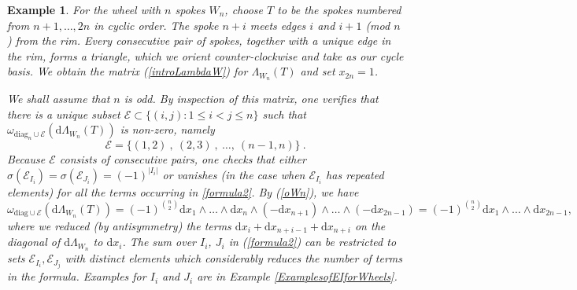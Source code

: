 \documentclass[10pt]{amsart}
\newcommand{\dd}{\mathrm{d}}
\newcommand{\sE}{\mathcal{E}}
\newcommand{\diag}{\mathrm{diag}}
\theoremstyle{plain}
\newtheorem{ex}[thm]{Example}
\newcommand{\0}{\color{blue}{\mathsf{0}}}
\begin{document}
\begin{ex}\label{wheelex5}
For the wheel with $n$ spokes $W_n$,  choose $T$ to be the spokes
 numbered from $n+1, \ldots, 2n$ in cyclic order. The spoke $n+i$ meets edges $i$ and $i+1$
(mod $n$) from the rim.
Every consecutive pair of spokes, together with a unique edge in the rim, forms a triangle, which we orient counter-clockwise and take as our  cycle basis. We obtain the matrix (\ref{introLambdaW}) for $\Lambda_{W_n}(T)$ and set $x_{2n}=1$.

We shall assume that $n$ is odd.  By inspection of this matrix,  one  verifies that there is a unique subset  $\sE \subset \{(i,j): 1\leq i<j\leq n\}$ such  that $\omega_{\diag_n\cup\sE}(\dd\Lambda_{W_n}(T))$ is non-zero, namely  
\[  \sE=\{(1,2) \ , \ (2,3) \ , \ \ldots, \ (n-1,n)\} \ . \]
Because $\sE$ consists of consecutive pairs, one checks that either  $\sigma(\sE_{I_i})=\sigma(\sE_{J_i})=(-1)^{|I_i|}$  or vanishes (in the case when $\sE_{I_i}$ has repeated elements) for all the terms occurring in \eqref{formula2}. 
By (\ref{oWn}), we have 
$$
\omega_{\diag\cup\sE}  (\dd\Lambda_{W_n}(T))=(-1)^{\binom{n}2}\dd x_1\wedge\ldots\wedge\dd x_n\wedge(-\dd x_{n+1})\wedge\ldots\wedge(-\dd x_{2n-1})=(-1)^{\binom{n}2}\dd x_1\wedge\ldots\wedge\dd x_{2n-1},
$$
where we reduced (by antisymmetry) the terms $\dd x_i+\dd x_{n+i-1}+\dd x_{n+i}$ on the diagonal of $\dd\Lambda_{W_n}$ to $\dd x_i$.
The sum over $I_i$, $J_i$ in (\ref{formula2}) can be restricted to sets $\sE_{I_i}, \sE_{J_j}$  with distinct elements which considerably reduces the number of terms in the formula.  Examples for $I_i$ and $J_i$ are in Example \ref{ExamplesofEIforWheels}. 
\end{ex}
\end{document}
